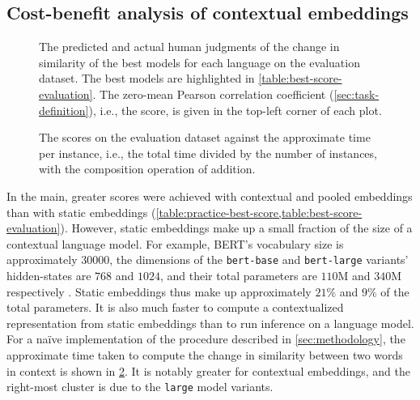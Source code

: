 \subsection{Cost-benefit analysis of contextual embeddings}
\label{sec:cost-benefit}

\begin{figure}
  \centering
  
  \caption{The predicted and actual human judgments of the change in similarity of the best
    models for each language on the evaluation dataset.
    The best models are highlighted in \cref{table:best-score-evaluation}.
    The zero-mean Pearson correlation coefficient (\cref{sec:task-definition}), i.e., the
    score, is given in the top-left corner of each plot.
  }
  \label{figure:predicted-actual}
\end{figure}

\begin{figure}
  \centering
  
  \caption{The scores on the evaluation dataset against the approximate time per
    instance, i.e., the total time divided by the number of instances, with the
    composition operation of addition.
  }
  \label{figure:score-time-evaluation}
\end{figure}

In the main, greater scores were achieved with contextual and pooled embeddings than
with static embeddings (\cref{table:practice-best-score,table:best-score-evaluation}).
However, static embeddings make up a small fraction of the size of a contextual
language model.
For example, BERT's vocabulary size is approximately $30000$, the dimensions of the
\texttt{bert-base} and \texttt{bert-large} variants' hidden-states are $768$ and
$1024$, and their total parameters are $110$M and $340$M respectively
\parencites[4173-4174]{Devlin2019}.
Static embeddings thus make up approximately $21$\% and $9$\% of the total parameters.
It is also much faster to compute a contextualized representation from static
embeddings than to run inference on a language model.
For a naïve implementation of the procedure described in \cref{sec:methodology}, the
approximate time taken to compute the change in similarity between two words in context
is shown in \cref{figure:score-time-evaluation}.
It is notably greater for contextual embeddings, and the right-most cluster is due to
the \texttt{large} model variants.

